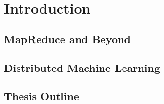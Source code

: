 \chapter{Introduction}

\section{MapReduce and Beyond}


\section{Distributed Machine Learning}


\section{Thesis Outline}
